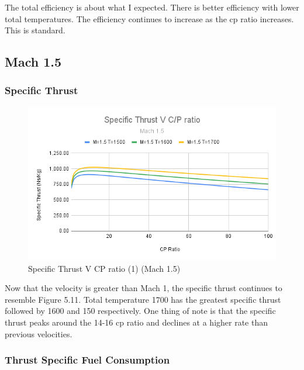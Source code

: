 \documentclass[12pt]{report}
\begin{document}
The total efficiency is about what I expected. There is better efficiency with lower total temperatures.  The efficiency continues to increase as the cp ratio increases.  This is standard.



\subsection{Mach 1.5}

\subsubsection{Specific Thrust}
\begin{figure}[H]
    \centering
    \includegraphics[width=15.5 cm]{Specific Thrust V C_P ratio (Mach 1.5).png}
    \caption{Specific Thrust V CP ratio (1) (Mach 1.5)}
    \label{fig:Specific Thrust V C_P ratio (1) (Mach 1.5)}
\end{figure}


Now that the velocity is greater than Mach 1, the specific thrust continues to resemble Figure 5.11. Total temperature 1700 has the greatest specific thrust followed by 1600 and 150 respectively. One thing of note is that the specific thrust peaks around the 14-16 cp ratio and declines at a higher rate than previous velocities.

\subsubsection{Thrust Specific Fuel Consumption}
\end{document}

